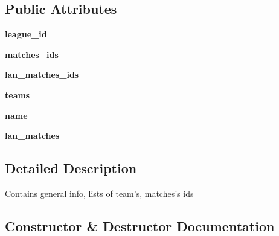 \subsection*{Public Attributes}
\begin{DoxyCompactItemize}
\item 
{\bfseries league\+\_\+id}\hypertarget{classleague_1_1_league_a0f90c5c4ca525bee48ddeb4e68024f93}{}\label{classleague_1_1_league_a0f90c5c4ca525bee48ddeb4e68024f93}

\item 
{\bfseries matches\+\_\+ids}\hypertarget{classleague_1_1_league_a4c36dc4e01574730afdb251f94d338a0}{}\label{classleague_1_1_league_a4c36dc4e01574730afdb251f94d338a0}

\item 
{\bfseries lan\+\_\+matches\+\_\+ids}\hypertarget{classleague_1_1_league_a237fd28b62a4cccbe2a7cf1e5896f4f8}{}\label{classleague_1_1_league_a237fd28b62a4cccbe2a7cf1e5896f4f8}

\item 
{\bfseries teams}\hypertarget{classleague_1_1_league_adfcb1b1a99da85c1f172724d4e4f1a2a}{}\label{classleague_1_1_league_adfcb1b1a99da85c1f172724d4e4f1a2a}

\item 
{\bfseries name}\hypertarget{classleague_1_1_league_a0b23879dba5aa1619953af45d3d9f95c}{}\label{classleague_1_1_league_a0b23879dba5aa1619953af45d3d9f95c}

\item 
{\bfseries lan\+\_\+matches}\hypertarget{classleague_1_1_league_a3c39a34ad0bdc4ec1054e92c80df37eb}{}\label{classleague_1_1_league_a3c39a34ad0bdc4ec1054e92c80df37eb}

\end{DoxyCompactItemize}


\subsection{Detailed Description}
\begin{DoxyVerb}Contains general info, lists of team's, matches's ids\end{DoxyVerb}
 

\subsection{Constructor \& Destructor Documentation}
